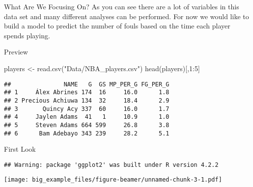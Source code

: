 \documentclass[
  ignorenonframetext,
]{beamer}
\newenvironment{Shaded}{\begin{snugshade}}{\end{snugshade}}
\newcommand{\DecValTok}[1]{\textcolor[rgb]{0.00,0.00,0.81}{#1}}
\newcommand{\FunctionTok}[1]{\textcolor[rgb]{0.00,0.00,0.00}{#1}}
\newcommand{\NormalTok}[1]{#1}
\newcommand{\OtherTok}[1]{\textcolor[rgb]{0.56,0.35,0.01}{#1}}
\newcommand{\SpecialCharTok}[1]{\textcolor[rgb]{0.00,0.00,0.00}{#1}}
\newcommand{\StringTok}[1]{\textcolor[rgb]{0.31,0.60,0.02}{#1}}
\begin{document}
\begin{frame}{What Are We Focusing On?}
\protect\hypertarget{what-are-we-focusing-on}{}
As you can see there are a lot of variables in this data set and many
different analyses can be performed. For now we would like to build a
model to predict the number of fouls based on the time each player
spends playing.
\end{frame}

\begin{frame}[fragile]{Preview}
\protect\hypertarget{preview}{}
\begin{Shaded}
\begin{Highlighting}[]
\NormalTok{players }\OtherTok{\textless{}{-}} \FunctionTok{read.csv}\NormalTok{(}\StringTok{"Data/NBA\_players.csv"}\NormalTok{)}
\FunctionTok{head}\NormalTok{(players)[,}\DecValTok{1}\SpecialCharTok{:}\DecValTok{5}\NormalTok{]}
\end{Highlighting}
\end{Shaded}

\begin{verbatim}
##               NAME   G  GS MP_PER_G FG_PER_G
## 1     Álex Abrines 174  16     16.0      1.8
## 2 Precious Achiuwa 134  32     18.4      2.9
## 3       Quincy Acy 337  60     16.0      1.7
## 4     Jaylen Adams  41   1     10.9      1.0
## 5     Steven Adams 664 599     26.8      3.8
## 6      Bam Adebayo 343 239     28.2      5.1
\end{verbatim}
\end{frame}

\begin{frame}[fragile]{First Look}
\protect\hypertarget{first-look}{}
\begin{verbatim}
## Warning: package 'ggplot2' was built under R version 4.2.2
\end{verbatim}

\texttt{[image: big\_example\_files/figure-beamer/unnamed-chunk-3-1.pdf]}
\end{frame}
\end{document}
